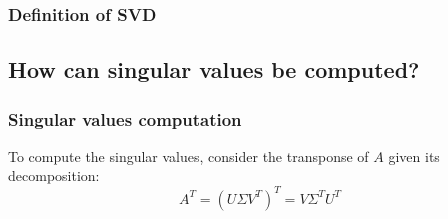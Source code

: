 \documentclass{beamer}
\begin{document}
\begin{frame}
    \frametitle{Definition of SVD}
    
\end{frame}

\subsection{How can singular values be computed?}

\begin{frame}
    \frametitle{Singular values computation}
    To compute the singular values, consider the transponse of $A$ given its decomposition:
    $$ A^T = (U \Sigma V^T)^T = V \Sigma^T U^T$$

    
\end{frame}
\end{document}
